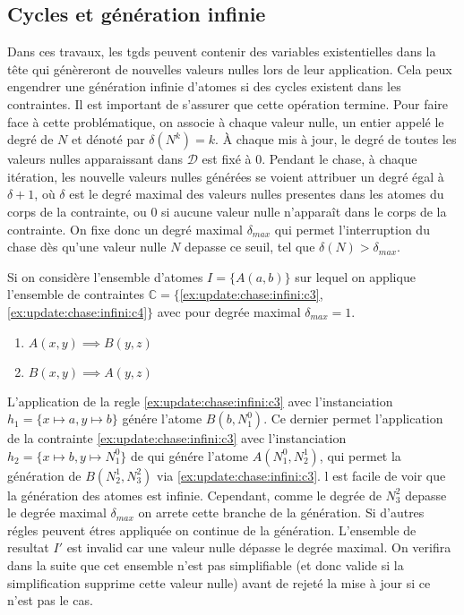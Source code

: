 \subsection{Cycles et génération infinie}
Dans ces travaux, les \glspl{tgd} peuvent contenir des variables existentielles dans la tête qui génèreront de nouvelles valeurs nulles lors de leur application.
Cela peux engendrer une génération infinie d'atomes si des cycles existent dans les contraintes.
Il est important de s'assurer que cette opération termine.
Pour faire face à cette problématique, on associe à chaque valeur nulle, un entier appelé le degré de $N$ et dénoté par $\delta(N^k) = k$.
À chaque mis à jour, le degré de toutes les valeurs nulles apparaissant dans $\mathcal{D}$ est fixé à $0$.
Pendant le \gls{chase}, à chaque itération, les nouvelle valeurs nulles générées se voient attribuer un degré égal à $\delta + 1$, où $\delta$ est le degré maximal des valeurs nulles presentes dans les atomes du corps de la contrainte, ou $0$ si aucune valeur nulle n'apparaît dans le corps de la contrainte.
On fixe donc un degré maximal $\delta_{max}$ qui permet l'interruption du \gls{chase} dès qu'une valeur nulle $N$ depasse ce seuil, tel que $\delta(N) > \delta_{max}$.

\begin{example}
    \label{ex:update:chase:infini}
    Si on considère l'ensemble d'atomes $I = \{A(a, b)\}$ sur lequel on applique l'ensemble de contraintes $\mathbb{C} = \{$\ref{ex:update:chase:infini:c3}, \ref{ex:update:chase:infini:c4}$\}$ avec pour degrée maximal $\delta_{max} = 1$.
    \begin{enumerate}[label=\textbf{$c_\arabic*$ :},ref=$c_\arabic*$]
        \item $A(x, y) \implies B(y, z)$ \label{ex:update:chase:infini:c3}
        \item $B(x, y) \implies A(y, z)$ \label{ex:update:chase:infini:c4}
    \end{enumerate}

    L'application de la regle \ref{ex:update:chase:infini:c3} avec l'instanciation $h_1 = \{x \mapsto a, y \mapsto b\}$ génére l'atome $B(b, N_1^0)$.
    Ce dernier permet l'application de la contrainte \ref{ex:update:chase:infini:c3} avec l'instanciation $h_2 = \{x \mapsto b, y \mapsto N_1^0\}$ de qui génére l'atome $A(N_1^0, N_2^1)$, qui permet la génération de $B(N_2^1, N_3^2)$ via \ref{ex:update:chase:infini:c3}.
    l est facile de voir que la génération des atomes est infinie.
    Cependant, comme le degrée de $N_3^2$ depasse le degrée maximal $\delta_{max}$ on arrete cette branche de la génération.
    Si d'autres régles peuvent étres appliquée on continue de la génération.
    L'ensemble de resultat $I'$ est invalid car une valeur nulle dépasse le degrée maximal.
    On verifira dans la suite que cet ensemble n'est pas simplifiable (et donc valide si la simplification supprime cette valeur nulle) avant de rejeté la mise à jour si ce n'est pas le cas.
\end{example}

